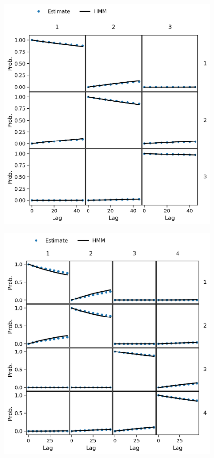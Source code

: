 \begin{figure}
    \centering
    \includegraphics{chapters/hmm_selection/figures/ck_test_5_3.png}
    
    \label{fig:prinz_ck_test_5_3}
\end{figure}

\begin{figure}
    \centering
    \includegraphics{chapters/hmm_selection/figures/ck_test_5_4.png}
    
    \label{fig:prinz_ck_test_5_4}
\end{figure}

